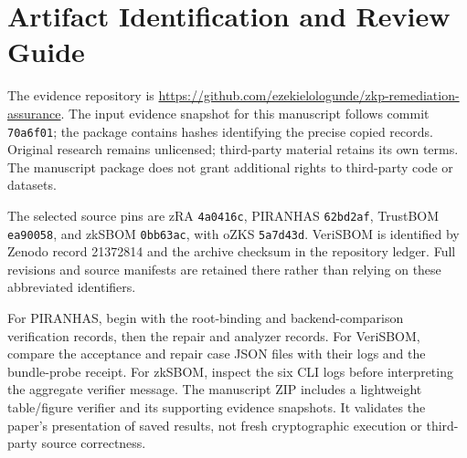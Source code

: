 \documentclass[sigconf,nonacm]{acmart}
\begin{document}
\appendix
\section{Artifact Identification and Review Guide}\label{sec:repro}
The evidence repository is \url{https://github.com/ezekielologunde/zkp-remediation-assurance}. The input evidence snapshot for this manuscript follows commit \texttt{70a6f01}; the package contains hashes identifying the precise copied records. Original research remains unlicensed; third-party material retains its own terms. The manuscript package does not grant additional rights to third-party code or datasets.

The selected source pins are zRA \texttt{4a0416c}, PIRANHAS \texttt{62bd2af}, TrustBOM \texttt{ea90058}, and zkSBOM \texttt{0bb63ac}, with oZKS \texttt{5a7d43d}. VeriSBOM is identified by Zenodo record 21372814 and the archive checksum in the repository ledger. Full revisions and source manifests are retained there rather than relying on these abbreviated identifiers.

For PIRANHAS, begin with the root-binding and backend-comparison verification records, then the repair and analyzer records. For VeriSBOM, compare the acceptance and repair case JSON files with their logs and the bundle-probe receipt. For zkSBOM, inspect the six CLI logs before interpreting the aggregate verifier message. The manuscript ZIP includes a lightweight table/figure verifier and its supporting evidence snapshots. It validates the paper's presentation of saved results, not fresh cryptographic execution or third-party source correctness.
\end{document}
